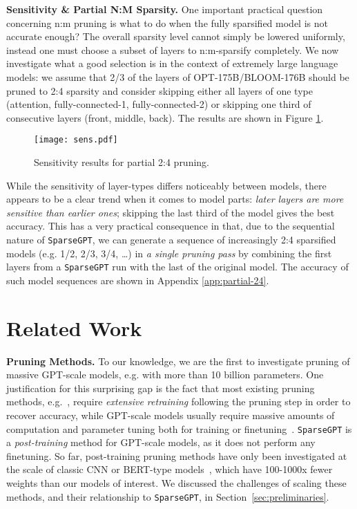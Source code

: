 \documentclass{article}
\theoremstyle{plain}
\theoremstyle{definition}
\theoremstyle{remark}
\renewcommand{\paragraph}[1]{\vspace{-0.1em} \noindent \textbf{#1}}
\newcommand{\sparsegpt}[1]{\texttt{SparseGPT}}
\begin{document}
\paragraph{Sensitivity \& Partial N:M Sparsity.} One important practical question concerning n:m pruning is what to do when the fully sparsified model is not accurate enough? The overall sparsity level cannot simply be lowered uniformly, instead one must choose a subset of layers to n:m-sparsify completely. We now investigate what a good selection is in the context of extremely large language models: we assume that 2/3 of the layers of OPT-175B/BLOOM-176B should be pruned to 2:4 sparsity and consider skipping either all layers of one type (attention, fully-connected-1, fully-connected-2) or skipping one third of consecutive layers (front, middle, back). The results  are shown in Figure \ref{fig:sensitivity}.

\begin{figure}[h!]
    \centering
    \texttt{[image: sens.pdf]}
    \vspace{-20pt}
    \caption{Sensitivity results for partial 2:4 pruning.}
    \label{fig:sensitivity}
\end{figure}

While the sensitivity of layer-types differs noticeably between models, there appears to be a clear trend when it comes to model parts: \textit{later layers are more sensitive than earlier ones}; skipping the last third of the model gives the best accuracy. This has a very practical consequence in that, due to the sequential nature of \sparsegpt{}, we can generate a sequence of increasingly 2:4 sparsified models (e.g. 1/2, 2/3, 3/4, \dots) in \textit{a single pruning pass} by combining the first  layers from a \sparsegpt{} run with the last  of the original model. The accuracy of such model sequences are shown in Appendix \ref{app:partial-24}.

\section{Related Work}

\textbf{Pruning Methods.} 
To our knowledge, we are the first to investigate pruning of massive GPT-scale models, e.g. with more than 10 billion parameters.
One justification for this surprising gap is the fact that most existing pruning methods, e.g.~\cite{han2015deep, gale2019state, kurtic2022gmp}, require \emph{extensive retraining} following the pruning step in order to recover accuracy, while GPT-scale models usually require massive amounts of computation and parameter tuning both for training or finetuning~\cite{zhang2022opt}.
\sparsegpt{} is a \emph{post-training} method for  GPT-scale models, as it does not perform any finetuning. 
So far, post-training pruning methods have only been investigated at the scale of classic CNN or BERT-type models~\cite{hubara2021accelerated, frantar2022obc, kwon2022fast}, which have 100-1000x fewer weights than our models of interest. 
We discussed the challenges of scaling these methods, and their relationship to \sparsegpt{}, in Section~\ref{sec:preliminaries}. 
\end{document}
